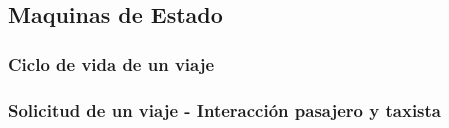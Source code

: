 \subsection{Maquinas de Estado}

\subsubsection{Ciclo de vida de un viaje}
\subsubsection{Solicitud de un viaje - Interacci\'on pasajero y taxista}
